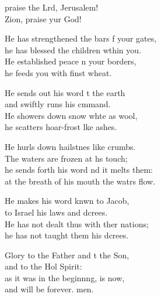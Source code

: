 \begin{psalmverse}
  \begin{patverse}
     praise the Lrd, Jerusalem!\Med\\
    Zion, praise yur God!
    
    He has strengthened the bars f your gates,\Med\\
    he has blessed the children w\pointup{\i}thin you.\\
    He established peace n your borders,\Med\\
    he feeds you with finst wheat.
    
    He sends out his word t the earth\Med\\
    and swiftly runs his cmmand.\\
    He showers down snow wh\pointup{\i}te as wool,\Med\\
    he scatters hoar-frost l\pointup{\i}ke ashes.
    
    He hurls down hailstnes like crumbs.\Med\\
    The waters are frozen at h\pointup{\i}s touch;\\
    he sends forth his word nd it melts them:\Med\\
    at the breath of his mouth the watrs flow.
    
    He makes his word knwn to Jacob,\Med\\
    to Israel his laws and dcrees.\\
    He has not dealt thus with ther nations;\Med\\
    he has not taught them his dcrees.
    
    Glory to the Father and t the Son,\Med\\
    and to the Hol Spirit:\\
    as it was in the beginn\pointup{\i}ng, is now,\Med\\
    and will be forever. men.
  \end{patverse}
\end{psalmverse}
